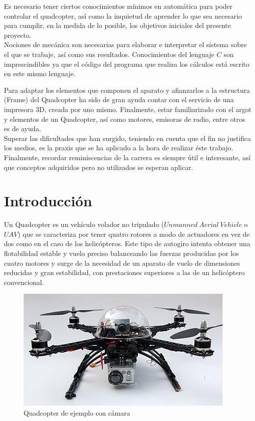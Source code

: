 \documentclass[twoside]{article}
\begin{document}
Es necesario tener ciertos conocimientos mínimos en automática para poder controlar el quadcopter, así como la inquietud de aprender lo que sea necesario para cumplir, en la medida de lo posible, los objetivos iniciales del presente proyecto. \\

Nociones de mecánica son necesarias para elaborar e interpretar el sistema sobre el que se trabaje, así como sus resultados. Conocimientos del lenguaje $C$ son imprescindibles ya que el código del programa que realiza los cálculos está escrito en este mismo lenguaje. 

Para adaptar los elementos que componen el aparato y afianzarlos a la estructura (Frame)  del Quadcopter ha sido de gran ayuda contar con el servicio de una impresora 3D, creada por uno mismo. Finalmente, estar familiarizado con el argot y elementos de un Quadcopter, así como motores, emisoras de radio, entre otros es de ayuda. \\

Superar las dificultades que han surgido, teniendo en cuenta que el fin no justifica los medios, es la praxis que se ha aplicado a la hora de realizar éste trabajo. Finalmente, recordar reminiscencias de la carrera es siempre útil e interesante, así que conceptos adquiridos pero no utilizados se esperan aplicar.
 
\newpage
\section{Introducción} \label{intro}

Un Quadcopter es un vehículo volador no tripulado ($Unmanned \>Aerial\>Vehicle$ o $UAV$) que se caracteriza por tener quatro rotores a modo de actuadores en vez de dos como en el caso de los helicópteros. Este tipo de autogiro intenta obtener una flotabilidad estable y vuelo preciso balanceando las fuerzas producidas por los cuatro motores y surge de la necesidad de un aparato de vuelo de dimensiones reducidas y gran estabilidad, con prestaciones superiores a las de un helicóptero convencional. \\

\begin{figure}[h!]
\begin{center}
\includegraphics[scale=0.4]{images/quadcopter_example.jpg}
\caption{Quadcopter de ejemplo con cámara}
\end{center}
\end{figure}
\end{document}
